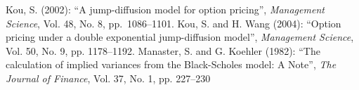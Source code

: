 \documentclass{article}
\begin{document}
\begin{thebibliography}{100}
 Kou, S. (2002): ``A jump-diffusion model for option pricing'', \emph{Management Science}, Vol. 48, No. 8, pp.~1086--1101.
	 Kou, S. and H. Wang (2004): ``Option pricing under a double exponential jump-diffusion model'', \emph{Management Science}, Vol. 50, No. 9, pp. 1178--1192.
	 Manaster, S. and G. Koehler (1982): ``The calculation of implied variances from the Black-Scholes model: A Note'', \emph{The Journal of Finance}, Vol. 37, No. 1, pp. 227--230

\end{thebibliography}
\end{document}
